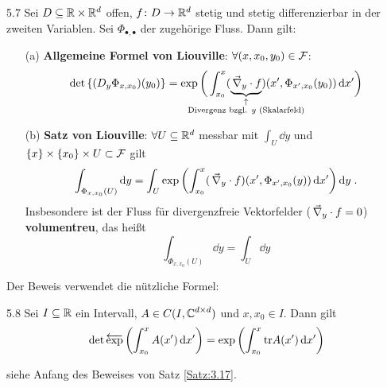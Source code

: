 \documentclass[a4paper]{article}
\begin{document}
\begin{Satz}{}{5.7}
Sei $D\subseteq \mathbb R\times \mathbb R^d$ offen, $f\colon D\to\mathbb R^d$ stetig und stetig differenzierbar in der zweiten Variablen. Sei $\Phi_{\bullet,\bullet}$ der zugehörige Fluss. Dann gilt:
\begin{itemize}
\item[(a)] \textbf{Allgemeine Formel von Liouville}: $\forall(x,x_0,y_0)\in\operatorname{\mathcal{F}}$:
\[\det\left\{(D_y\Phi_{x,x_0})(y_0)\right\}=\exp\bigg(\int_{x_0}^x(\underbrace{\nn_y\cdot f}_{\mathclap{\substack{\uparrow\\\text{Divergenz bzgl. $y$ (Skalarfeld)}}}})(x',\Phi_{x',x_0}(y_0))\dd x'\bigg)\]
\item[(b)]\textbf{Satz von Liouville}:
$\forall U\subseteq \mathbb R^d$ messbar mit $\int_U\dd y$ und $\{x\}\times\{x_0\}\times U\subset \operatorname{\mathcal{F}}$ gilt 
\[\int_{\Phi_{x,x_0}(U)}\mathop{}\!\mathrm{d} y=\int_U\exp\left(\int_{x_0}^x(\mathop{}\Vec{\nabla}_y\cdot f)(x',\Phi_{x',x_0}(y))\mathop{}\!\mathrm{d} x'\right)\mathop{}\!\mathrm{d} y\;.\] Insbesondere ist der Fluss für divergenzfreie Vektorfelder ($\mathop{}\Vec{\nabla}_y\cdot f=0$) \textbf{volumentreu}, das heißt
\[\int_{\Phi_{x,x_0}(U)}\dd y=\int_U\dd y\]
\end{itemize}
\end{Satz}

Der Beweis verwendet die nützliche Formel:

\begin{Lemma}{}{5.8}
Sei $I\subseteq \mathbb R$ ein Intervall, $A\in C(I,\operatorname{\mathbb C}^{d\times d})$ und $x,x_0\in I$. Dann gilt
\[\det \overleftarrow{\exp}\left(\int_{x_0}^xA(x')\mathop{}\!\mathrm{d} x'\right)=\exp\left(\int_{x_0}^x\textrm{tr} A(x')\mathop{}\!\mathrm{d} x'\right)\]
\end{Lemma}

\begin{Beweis}
siehe Anfang des Beweises von Satz \ref{Satz:3.17}.
\end{Beweis}
\end{document}
